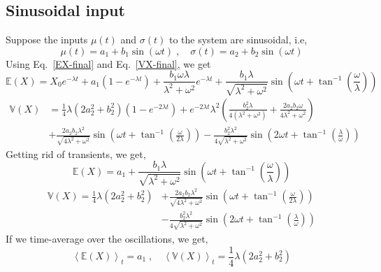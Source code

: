 \documentclass[12pt]{iopart}
\begin{document}
\subsection{Sinusoidal input}
Suppose the inputs $\mu(t)$ and $\sigma(t)$ to the system are sinusoidal, i.e,
\begin{equation}
\label{sin-input}
\mu(t)=a_1 + b_1 \sin{(\omega t)}\;,\quad\sigma(t)=a_2+b_2\sin{(\omega t)}
\end{equation}
Using Eq.~\eqref{EX-final} and Eq.~\eqref{VX-final}, we get
\begin{equation}
\label{EX-sin-full}
\mathbb{E}(X) = X_0 e^{-\lambda t} + a_1\left(1-e^{-\lambda t}\right) + \frac{b_1\omega\lambda}{\lambda^2+\omega^2} e^{-\lambda t} + \frac{b_1 \lambda}{\sqrt{\lambda^2+\omega^2}} \sin{\left(\omega t + \tan^{-1}{\left(\frac{\omega}{\lambda}\right)}\right)}
\end{equation}
\begin{align}
\label{VX-sin-full}
\mathbb{V}(X) &= \frac{1}{4}\lambda\left(2 a_2^2 + b_2^2\right)\left(1-e^{-2\lambda t}\right) +e^{-2\lambda t}\lambda^2\left(\frac{b_2^2\lambda}{4(\lambda^2+\omega^2)}+\frac{2 a_2 b_2 \omega}{4\lambda^2 + \omega^2}\right) \nonumber \\
&+ \frac{2 a_2 b_2 \lambda^2}{\sqrt{4\lambda^2+\omega^2}} \sin{\left(\omega t + \tan^{-1}{\left(\frac{\omega}{2\lambda}\right)}\right)}-\frac{b_2^2\lambda^2}{4\sqrt{\lambda^2+\omega^2}} \sin{\left(2 \omega t + \tan^{-1}{\left(\frac{\lambda}{\omega}\right)}\right)}
\end{align}
Getting rid of transients, we get,
\begin{equation}
\label{EX-sin}
\mathbb{E}(X) = a_1 + \frac{b_1 \lambda}{\sqrt{\lambda^2+\omega^2}} \sin{\left(\omega t + \tan^{-1}{\left(\frac{\omega}{\lambda}\right)}\right)}
\end{equation}
\begin{align}
\label{VX-sin}
\mathbb{V}(X) = \frac{1}{4}\lambda\left(2 a_2^2 + b_2^2\right) &+ \frac{2 a_2 b_2 \lambda^2}{\sqrt{4\lambda^2+\omega^2}} \sin{\left(\omega t + \tan^{-1}{\left(\frac{\omega}{2\lambda}\right)}\right)} \nonumber \\ &- \frac{b_2^2\lambda^2}{4\sqrt{\lambda^2+\omega^2}} \sin{\left(2 \omega t + \tan^{-1}{\left(\frac{\lambda}{\omega}\right)}\right)}
\end{align}
If we time-average over the oscillations, we get,
\begin{equation}
\label{EX-VX-sin-timeaverage}
\left\langle \mathbb{E}(X)\right\rangle_t = a_1\;,\quad \left\langle\mathbb{V}(X)\right\rangle_t = \frac{1}{4}\lambda\left(2 a_2^2+b_2^2\right)
\end{equation}
\end{document}
